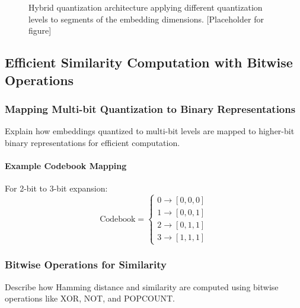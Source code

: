 \begin{figure}[ht]  
    \centering  
    \caption{Hybrid quantization architecture applying different quantization levels to segments of the embedding dimensions. [Placeholder for figure]}  
    \label{fig:hybrid_architecture}  
\end{figure}  
  
\subsection{Efficient Similarity Computation with Bitwise Operations}  
\label{sec:similarity_computation}  
  
\subsubsection{Mapping Multi-bit Quantization to Binary Representations}  
Explain how embeddings quantized to multi-bit levels are mapped to higher-bit binary representations for efficient computation.  
  
\paragraph{Example Codebook Mapping}  
For 2-bit to 3-bit expansion:  
\begin{equation}  
\text{Codebook} = \begin{cases}  
0 \rightarrow [0, 0, 0] \\  
1 \rightarrow [0, 0, 1] \\  
2 \rightarrow [0, 1, 1] \\  
3 \rightarrow [1, 1, 1]  
\end{cases}  
\end{equation}  
  
\subsubsection{Bitwise Operations for Similarity}  
Describe how Hamming distance and similarity are computed using bitwise operations like XOR, NOT, and POPCOUNT.  
  